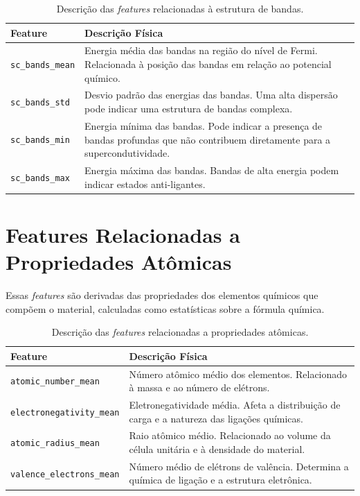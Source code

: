 \documentclass[12pt, a4paper, oneside]{report}
\begin{document}
\begin{table}[H]
    \centering
    \caption{Descrição das \textit{features} relacionadas à estrutura de bandas.}
    \begin{tabular}{lp{10cm}}
        \toprule
        \textbf{Feature} & \textbf{Descrição Física} \\
        \midrule
        \texttt{sc\_bands\_mean} & Energia média das bandas na região do nível de Fermi. Relacionada à posição das bandas em relação ao potencial químico. \\
        \texttt{sc\_bands\_std} & Desvio padrão das energias das bandas. Uma alta dispersão pode indicar uma estrutura de bandas complexa. \\
        \texttt{sc\_bands\_min} & Energia mínima das bandas. Pode indicar a presença de bandas profundas que não contribuem diretamente para a supercondutividade. \\
        \texttt{sc\_bands\_max} & Energia máxima das bandas. Bandas de alta energia podem indicar estados anti-ligantes. \\
        \bottomrule
    \end{tabular}
\end{table}

\section{Features Relacionadas a Propriedades Atômicas}

Essas \textit{features} são derivadas das propriedades dos elementos químicos que compõem o material, calculadas como estatísticas sobre a fórmula química.

\begin{table}[H]
    \centering
    \caption{Descrição das \textit{features} relacionadas a propriedades atômicas.}
    \begin{tabular}{lp{10cm}}
        \toprule
        \textbf{Feature} & \textbf{Descrição Física} \\
        \midrule
        \texttt{atomic\_number\_mean} & Número atômico médio dos elementos. Relacionado à massa e ao número de elétrons. \\
        \texttt{electronegativity\_mean} & Eletronegatividade média. Afeta a distribuição de carga e a natureza das ligações químicas. \\
        \texttt{atomic\_radius\_mean} & Raio atômico médio. Relacionado ao volume da célula unitária e à densidade do material. \\
        \texttt{valence\_electrons\_mean} & Número médio de elétrons de valência. Determina a química de ligação e a estrutura eletrônica. \\
        \bottomrule
    \end{tabular}
\end{table}
\end{document}
